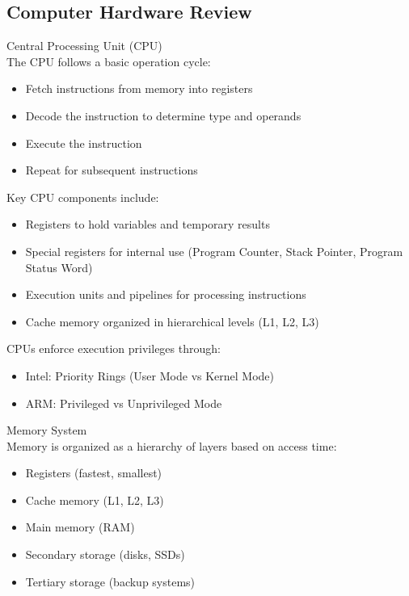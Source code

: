 \subsection{Computer Hardware Review}

\begin{definition}{Central Processing Unit (CPU)}\\
    The CPU follows a basic operation cycle:
    \begin{itemize}
        \item Fetch instructions from memory into registers
        \item Decode the instruction to determine type and operands
        \item Execute the instruction
        \item Repeat for subsequent instructions
    \end{itemize}
    
    Key CPU components include:
    \begin{itemize}
        \item Registers to hold variables and temporary results
        \item Special registers for internal use (Program Counter, Stack Pointer, Program Status Word)
        \item Execution units and pipelines for processing instructions
        \item Cache memory organized in hierarchical levels (L1, L2, L3)
    \end{itemize}
    
    CPUs enforce execution privileges through:
    \begin{itemize}
        \item Intel: Priority Rings (User Mode vs Kernel Mode)
        \item ARM: Privileged vs Unprivileged Mode
    \end{itemize}
\end{definition}

\begin{definition}{Memory System}\\
    Memory is organized as a hierarchy of layers based on access time:
    \begin{itemize}
        \item Registers (fastest, smallest)
        \item Cache memory (L1, L2, L3)
        \item Main memory (RAM)
        \item Secondary storage (disks, SSDs)
        \item Tertiary storage (backup systems)
    \end{itemize}
\end{definition}

